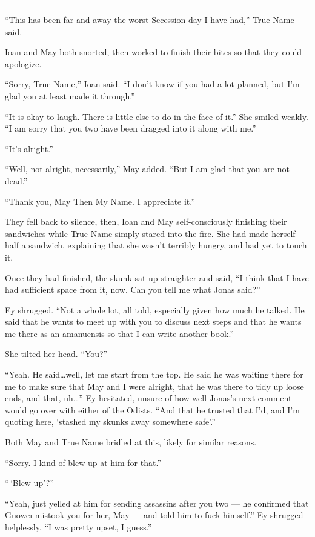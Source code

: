 \begin{center}\rule{0.5\linewidth}{0.5pt}\end{center}

``This has been far and away the worst Secession day I have had,'' True Name said.

Ioan and May both snorted, then worked to finish their bites so that they could apologize.

``Sorry, True Name,'' Ioan said. ``I don't know if you had a lot planned, but I'm glad you at least made it through.''

``It is okay to laugh. There is little else to do in the face of it.'' She smiled weakly. ``I am sorry that you two have been dragged into it along with me.''

``It's alright.''

``Well, not alright, necessarily,'' May added. ``But I am glad that you are not dead.''

``Thank you, May Then My Name. I appreciate it.''

They fell back to silence, then, Ioan and May self-consciously finishing their sandwiches while True Name simply stared into the fire. She had made herself half a sandwich, explaining that she wasn't terribly hungry, and had yet to touch it.

Once they had finished, the skunk sat up straighter and said, ``I think that I have had sufficient space from it, now. Can you tell me what Jonas said?''

Ey shrugged. ``Not a whole lot, all told, especially given how much he talked. He said that he wants to meet up with you to discuss next steps and that he wants me there as an amanuensis so that I can write another book.''

She tilted her head. ``You?''

``Yeah. He said\ldots well, let me start from the top. He said he was waiting there for me to make sure that May and I were alright, that he was there to tidy up loose ends, and that, uh\ldots{}'' Ey hesitated, unsure of how well Jonas's next comment would go over with either of the Odists. ``And that he trusted that I'd, and I'm quoting here, `stashed my skunks away somewhere safe'.''

Both May and True Name bridled at this, likely for similar reasons.

``Sorry. I kind of blew up at him for that.''

``\,`Blew up'?''

``Yeah, just yelled at him for sending assassins after you two — he confirmed that Guōweī mistook you for her, May — and told him to fuck himself.'' Ey shrugged helplessly. ``I was pretty upset, I guess.''

